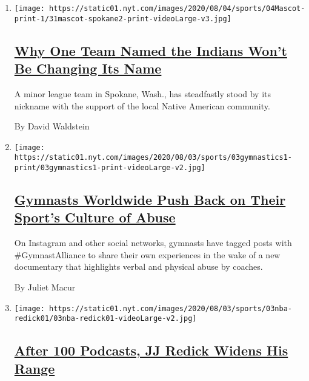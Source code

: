 \begin{enumerate}
\def\labelenumi{\arabic{enumi}.}
\item
  \texttt{[image: https://static01.nyt.com/images/2020/08/04/sports/04Mascot-print-1/31mascot-spokane2-print-videoLarge-v3.jpg]}

  \hypertarget{why-one-team-named-the-indians-wont-be-changing-its-name}{%
  \subsection{\texorpdfstring{\href{/2020/08/03/sports/baseball/indians-team-names-mascots.html}{Why
  One Team Named the Indians Won't Be Changing Its
  Name}}{Why One Team Named the Indians Won't Be Changing Its Name}}\label{why-one-team-named-the-indians-wont-be-changing-its-name}}

  A minor league team in Spokane, Wash., has steadfastly stood by its
  nickname with the support of the local Native American community.

  By David Waldstein
\item
  \texttt{[image: https://static01.nyt.com/images/2020/08/03/sports/03gymnastics1-print/03gymnastics1-print-videoLarge-v2.jpg]}

  \hypertarget{gymnasts-worldwide-push-back-on-their-sports-culture-of-abuse}{%
  \subsection{\texorpdfstring{\href{/2020/08/03/sports/olympics/gymnastics-abuse-athlete-a.html}{Gymnasts
  Worldwide Push Back on Their Sport's Culture of
  Abuse}}{Gymnasts Worldwide Push Back on Their Sport's Culture of Abuse}}\label{gymnasts-worldwide-push-back-on-their-sports-culture-of-abuse}}

  On Instagram and other social networks, gymnasts have tagged posts
  with \#GymnastAlliance to share their own experiences in the wake of a
  new documentary that highlights verbal and physical abuse by coaches.

  By Juliet Macur
\item
  \texttt{[image: https://static01.nyt.com/images/2020/08/03/sports/03nba-redick01/03nba-redick01-videoLarge-v2.jpg]}

  \hypertarget{after-100-podcasts-jj-redick-widens-his-range}{%
  \subsection{\texorpdfstring{\href{/2020/08/03/sports/jj-redick-podcast.html}{After
  100 Podcasts, JJ Redick Widens His
  Range}}{After 100 Podcasts, JJ Redick Widens His Range}}\label{after-100-podcasts-jj-redick-widens-his-range}}


\end{enumerate}
